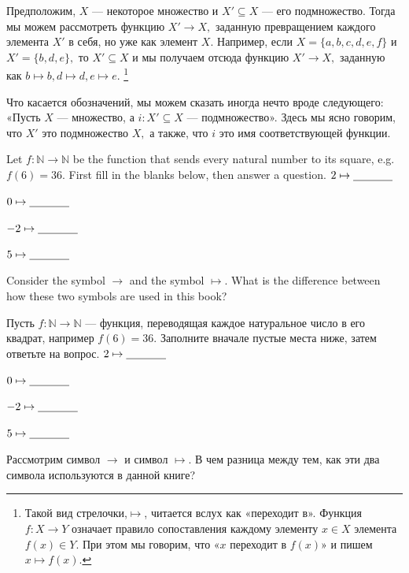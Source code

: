 \documentclass[../main/CT4S-EN-RU]{subfiles}
\begin{document}
\begin{exampleRUS}\label{ex:subset as function}
Предположим, $X$ — некоторое множество и $X'\subseteq X$ — его подмножество. Тогда мы можем рассмотреть функцию $X'{→} X,$ заданную превращением каждого элемента $X'$ в себя, но уже как элемент $X.$ Например, если $X=\{a,b,c,d,e,f\}$ и $X'=\{b,d,e\},$ то $X'\subseteq X$ и мы получаем отсюда функцию $X'{→} X,$ заданную как $b\mapsto b, d\mapsto d, e\mapsto e.$%
\footnote{Такой вид стрелочки,\;\;$\mapsto$\;\;, читается вслух как «переходит в». Функция $f\colon X{→} Y$ означает правило сопоставления каждому элементу $x\in X$ элемента $f(x)\in Y.$ При этом мы говорим, что «$x$ переходит в $f(x)$» и пишем $x\mapsto f(x).$}

Что касается обозначений, мы можем сказать иногда нечто вроде следующего: «Пусть $X$ — множество, а $i\colon X'\subseteq X$ — подмножество». Здесь мы ясно говорим, что $X'$ это подмножество $X,$ а также, что $i$ это имя соответствующей функции.
\end{exampleRUS}

\begin{exerciseENG}
Let $f\colon{ℕ}{→}{ℕ}$ be the function that sends every natural number to its square, e.g. $f(6)=36.$ First fill in the blanks below, then answer a question.
\sexc $2\mapsto\underline{\hspace{.5in}}$
\item $0\mapsto\underline{\hspace{.5in}}$
\item $-2\mapsto\underline{\hspace{.5in}}$
\item $5\mapsto\underline{\hspace{.5in}}$
\item Consider the symbol ${→}$ and the symbol $\mapsto.$ What is the difference between how these two symbols are used in this book?
\endsexc
\end{exerciseENG}

\begin{exerciseRUS}
Пусть $f\colon{ℕ}{→}{ℕ}$ — функция, переводящая каждое натуральное число в его квадрат, например $f(6)=36.$ Заполните вначале пустые места ниже, затем ответьте на вопрос.
\sexc $2\mapsto\underline{\hspace{.5in}}$
\item $0\mapsto\underline{\hspace{.5in}}$
\item $-2\mapsto\underline{\hspace{.5in}}$
\item $5\mapsto\underline{\hspace{.5in}}$
\item Рассмотрим символ ${→}$ и символ $\mapsto.$ В чем разница между тем, как эти два символа используются в данной книге?
\endsexc
\end{exerciseRUS}
\end{document}
